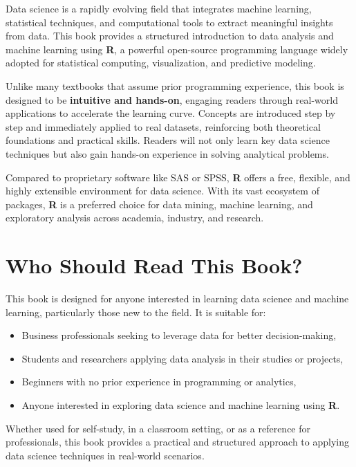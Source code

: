 \documentclass[
]{book}
\providecommand{\tightlist}{%
  \setlength{\itemsep}{0pt}\setlength{\parskip}{0pt}}
\theoremstyle{definition}
\theoremstyle{definition}
\theoremstyle{definition}
\theoremstyle{definition}
\theoremstyle{remark}
\begin{document}
Data science is a rapidly evolving field that integrates machine learning, statistical techniques, and computational tools to extract meaningful insights from data. This book provides a structured introduction to data analysis and machine learning using \textbf{R}, a powerful open-source programming language widely adopted for statistical computing, visualization, and predictive modeling.

Unlike many textbooks that assume prior programming experience, this book is designed to be \textbf{intuitive and hands-on}, engaging readers through real-world applications to accelerate the learning curve. Concepts are introduced step by step and immediately applied to real datasets, reinforcing both theoretical foundations and practical skills. Readers will not only learn key data science techniques but also gain hands-on experience in solving analytical problems.

Compared to proprietary software like SAS or SPSS, \textbf{R} offers a free, flexible, and highly extensible environment for data science. With its vast ecosystem of packages, \textbf{R} is a preferred choice for data mining, machine learning, and exploratory analysis across academia, industry, and research.

\section*{Who Should Read This Book?}\label{who-should-read-this-book}

This book is designed for anyone interested in learning data science and machine learning, particularly those new to the field. It is suitable for:

\begin{itemize}
\tightlist
\item
  Business professionals seeking to leverage data for better decision-making,\\
\item
  Students and researchers applying data analysis in their studies or projects,\\
\item
  Beginners with no prior experience in programming or analytics,\\
\item
  Anyone interested in exploring data science and machine learning using \textbf{R}.
\end{itemize}

Whether used for self-study, in a classroom setting, or as a reference for professionals, this book provides a practical and structured approach to applying data science techniques in real-world scenarios.
\end{document}
